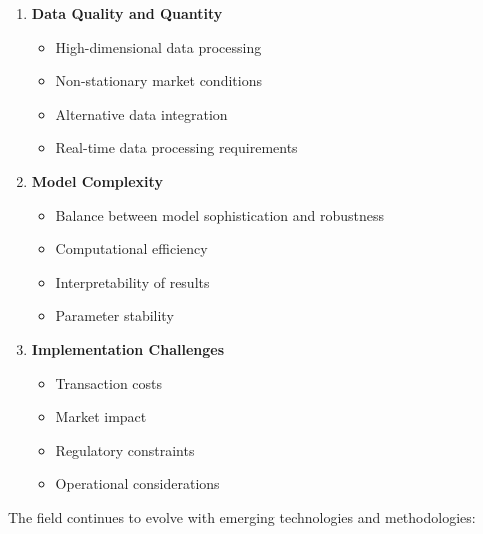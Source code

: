 \begin{enumerate}
    \item \textbf{Data Quality and Quantity}
    \begin{itemize}
        \item High-dimensional data processing
        \item Non-stationary market conditions
        \item Alternative data integration
        \item Real-time data processing requirements
    \end{itemize}

    \item \textbf{Model Complexity}
    \begin{itemize}
        \item Balance between model sophistication and robustness
        \item Computational efficiency
        \item Interpretability of results
        \item Parameter stability
    \end{itemize}

    \item \textbf{Implementation Challenges}
    \begin{itemize}
        \item Transaction costs
        \item Market impact
        \item Regulatory constraints
        \item Operational considerations
    \end{itemize}
\end{enumerate}

The field continues to evolve with emerging technologies and methodologies:

